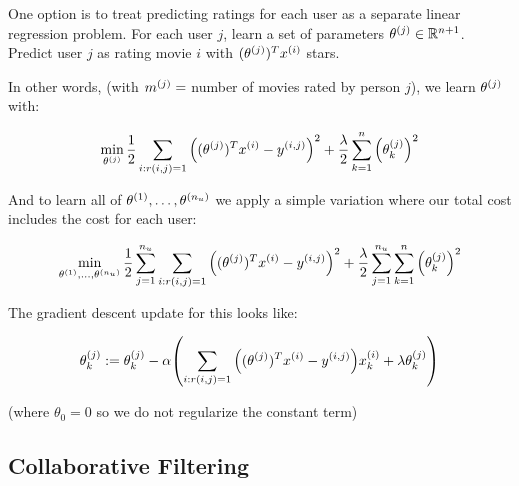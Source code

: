 One option is to treat predicting ratings for each user as a separate linear regression problem.
For each user $j$, learn a set of parameters $\theta_{}^{(j)} \in \mathbb{R}^{n+1}$.
Predict user $j$ as rating movie $i$ with $(\theta_{}^{(j)})^T x_{}^{(i)}$ stars.

In other words, (with $m_{}^{(j)}=$ number of movies rated by person $j$), we learn $\theta_{}^{(j)}$ with:

\[
    \min_{\theta_{}^{(j)}}
    \frac{1}{2} \sum_{i:r(i,j)=1} \qty( (\theta_{}^{(j)})^T x_{}^{(i)} - y_{}^{(i,j)} )^2
    + \frac{\lambda}{2} \sum_{k=1}^n \qty( \theta_{k}^{(j)} )^2
\]

And to learn all of $\theta_{}^{(1)}, \dots, \theta_{}^{(n_u)}$ we apply a simple variation
where our total cost includes the cost for each user:

\[
    \min_{\theta_{}^{(1)}, \dots, \theta_{}^{(n_u)}}
    \frac{1}{2} \sum_{j=1}^{n_u} \sum_{i:r(i,j)=1} \qty( (\theta_{}^{(j)})^T x_{}^{(i)} - y_{}^{(i,j)} )^2
    + \frac{\lambda}{2} \sum_{j=1}^{n_u} \sum_{k=1}^n \qty( \theta_{k}^{(j)} )^2
\]

The gradient descent update for this looks like:

\[
    \theta_{k}^{(j)} := \theta_{k}^{(j)} - \alpha \qty(
        \sum_{i:r(i,j)=1} \qty( 
            (\theta_{}^{(j)})^T x_{}^{(i)} - y_{}^{(i,j)} 
        ) x_{k}^{(i)}
        + \lambda \theta_{k}^{(j)}
    )
\]

(where $\theta_0=0$ so we do not regularize the constant term)

\subsection{Collaborative Filtering}